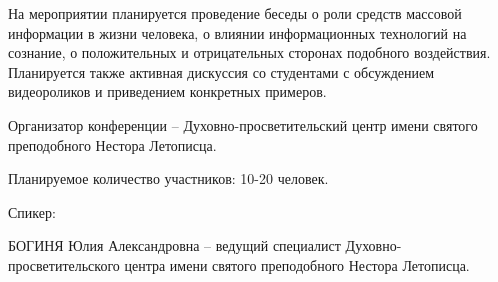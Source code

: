 На мероприятии планируется проведение беседы о роли средств массовой информации
в жизни человека, о влиянии информационных технологий на сознание, о
положительных и отрицательных сторонах подобного воздействия. Планируется также
активная дискуссия со студентами с обсуждением видеороликов и приведением
конкретных примеров.

Организатор конференции – Духовно-просветительский центр имени святого
преподобного Нестора Летописца.

Планируемое количество участников: 10-20 человек.

Спикер:

БОГИНЯ Юлия Александровна – ведущий специалист Духовно-просветительского центра
имени святого преподобного Нестора Летописца.
